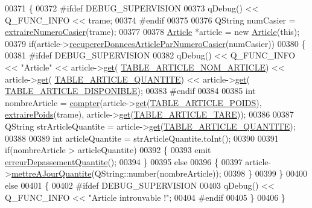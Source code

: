 \begin{DoxyCode}
00371 \{
00372 \textcolor{preprocessor}{    #ifdef DEBUG\_SUPERVISION}
00373         qDebug() << Q\_FUNC\_INFO << trame;
00374 \textcolor{preprocessor}{    #endif    }
00375 
00376     QString numCasier = \hyperlink{class_supervision_a141a35024b0cb74636a8c6810a1ab26d}{extraireNumeroCasier}(trame);
00377 
00378     \hyperlink{class_article}{Article} *article = \textcolor{keyword}{new} \hyperlink{class_article}{Article}(\textcolor{keyword}{this});
00379     \textcolor{keywordflow}{if}(article->\hyperlink{class_article_a5d8241c703f142bbc8b011f867fd953f}{recupererDonneesArticleParNumeroCasier}(numCasier))
00380     \{
00381 \textcolor{preprocessor}{        #ifdef DEBUG\_SUPERVISION}
00382             qDebug() << Q\_FUNC\_INFO << \textcolor{stringliteral}{"Article"} << article->\hyperlink{class_article_a81e89d4821991a69277f3a0f8e88a001}{get}(
      \hyperlink{_article_8h_a159354683cfd6e1b578172fbe6490ab6a7a309a358c54f9ea482a222d0cb4d135}{TABLE\_ARTICLE\_NOM\_ARTICLE}) << article->\hyperlink{class_article_a81e89d4821991a69277f3a0f8e88a001}{get}(
      \hyperlink{_article_8h_a159354683cfd6e1b578172fbe6490ab6a7273e06be37f8ea80b1c9c16224ebb86}{TABLE\_ARTICLE\_QUANTITE}) << article->\hyperlink{class_article_a81e89d4821991a69277f3a0f8e88a001}{get}(
      \hyperlink{_article_8h_a159354683cfd6e1b578172fbe6490ab6a105c98cbf3533c6bd74eb706c5d524d6}{TABLE\_ARTICLE\_DISPONIBLE});
00383 \textcolor{preprocessor}{        #endif}
00384 
00385         \textcolor{keywordtype}{int} nombreArticle = \hyperlink{class_supervision_a81b1b8960cb2857be4a6789cf27cd413}{compter}(article->\hyperlink{class_article_a81e89d4821991a69277f3a0f8e88a001}{get}(\hyperlink{_article_8h_a159354683cfd6e1b578172fbe6490ab6a8e65e0dbe78b66152adb0ffd76dd2ece}{TABLE\_ARTICLE\_POIDS}), 
      \hyperlink{class_supervision_afdef41cd85f2ecfae9d1dc46f556a034}{extrairePoids}(trame), article->\hyperlink{class_article_a81e89d4821991a69277f3a0f8e88a001}{get}(\hyperlink{_article_8h_a159354683cfd6e1b578172fbe6490ab6a970d883b74adb323da887e30bef922f5}{TABLE\_ARTICLE\_TARE}));
00386 
00387         QString strArticleQuantite = article->\hyperlink{class_article_a81e89d4821991a69277f3a0f8e88a001}{get}(\hyperlink{_article_8h_a159354683cfd6e1b578172fbe6490ab6a7273e06be37f8ea80b1c9c16224ebb86}{TABLE\_ARTICLE\_QUANTITE});
00388 
00389         \textcolor{keywordtype}{int} articleQuantite = strArticleQuantite.toInt();
00390 
00391         \textcolor{keywordflow}{if}(nombreArticle > articleQuantite)
00392         \{
00393             emit \hyperlink{class_supervision_a3fb19a3c16324a21af956fd272ca469d}{erreurDepassementQuantite}();
00394         \}
00395         \textcolor{keywordflow}{else}
00396         \{
00397             article->\hyperlink{class_article_a5777f36d74974ff21e712a9875c2d8bf}{mettreAJourQuantite}(QString::number(nombreArticle));
00398         \}
00399     \}
00400     \textcolor{keywordflow}{else}
00401     \{
00402 \textcolor{preprocessor}{        #ifdef DEBUG\_SUPERVISION}
00403             qDebug() << Q\_FUNC\_INFO << \textcolor{stringliteral}{"Article introuvable !"};
00404 \textcolor{preprocessor}{        #endif}
00405     \}
00406 \}
\end{DoxyCode}
